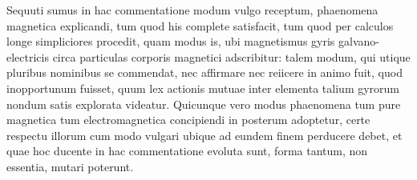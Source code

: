 Sequuti sumus in hac commentatione modum vulgo receptum, phaenomena magnetica explicandi, tum quod his complete satisfacit, tum quod per calculos longe simpliciores procedit, quam modus is, ubi magnetismus gyris galvano-electricis circa particulas corporis magnetici adscribitur: talem modum, qui utique pluribus nominibus se commendat, nec affirmare nec reiicere in animo fuit, quod inopportunum fuisset, quum lex actionis mutuae inter elementa talium gyrorum nondum satis explorata videatur. Quicunque vero modus phaenomena tum pure magnetica tum electromagnetica concipiendi in posterum adoptetur, certe respectu illorum cum modo vulgari ubique ad eundem finem perducere debet, et quae hoc ducente in hac commentatione evoluta sunt, forma tantum, non essentia, mutari poterunt.
